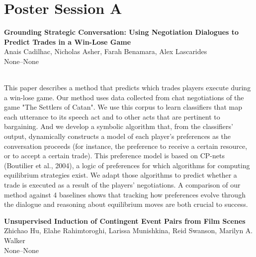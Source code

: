 \documentclass[twoside,makeidx]{book}
\renewcommand{\normalsize}{\fontsize{8}{9}\selectfont}
\renewcommand{\small}{\fontsize{7}{8}\selectfont}
\begin{document}
\section{Poster Session A}
\vspace{-1em}
\par\vspace{2em}\noindent%
\begin{minipage}{\linewidth}%
\begin{center}
\textbf{\normalsize Grounding Strategic Conversation: Using Negotiation Dialogues to Predict Trades in a Win-Lose Game}\\
\normalsize  Anais Cadilhac,  Nicholas Asher,  Farah Benamara,  Alex Lascarides\\
{\small None--None}\\
\end{center}
\end{minipage}\\[0.5em]
\nopagebreak%
\noindent%
{\small This paper describes a method that predicts which trades players execute during a win-lose game. Our method uses data collected from chat negotiations of the game "The Settlers of Catan". We use this corpus to learn classifiers that map each utterance to its speech act and to other acts that are pertinent to bargaining. And we develop a symbolic algorithm that, from the classifiers' output, dynamically constructs a model of each player's preferences as the conversation proceeds (for instance, the preference to receive a certain resource, or to accept a certain trade). This preference model is based on CP-nets (Boutilier et al., 2004), a logic of preferences for which algorithms for computing equilibrium strategies exist. We adapt those algorithms to  predict whether a trade is executed as a result of the players' negotiations. A comparison of our method against 4 baselines shows that tracking how preferences evolve through the dialogue and reasoning about equilibrium moves are both crucial to success.}
\par\vspace{2em}\noindent%
\begin{minipage}{\linewidth}%
\begin{center}
\textbf{\normalsize Unsupervised Induction of Contingent Event Pairs from Film Scenes}\\
\normalsize  Zhichao Hu,  Elahe Rahimtoroghi,  Larissa Munishkina,  Reid Swanson,  Marilyn A. Walker\\
{\small None--None}\\
\end{center}
\end{minipage}\\[0.5em]
\end{document}
